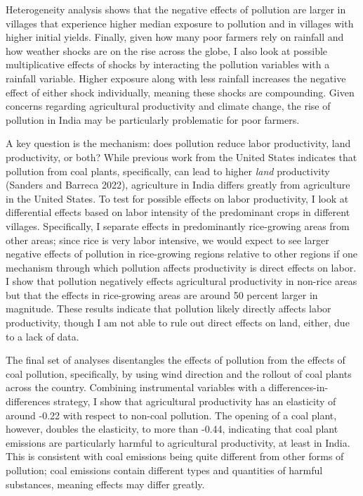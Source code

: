 \documentclass[
]{article}
\begin{document}
Heterogeneity analysis shows that the negative effects of pollution are larger in villages that experience higher median exposure to pollution and in villages with higher initial yields. Finally, given how many poor farmers rely on rainfall and how weather shocks are on the rise across the globe, I also look at possible multiplicative effects of shocks by interacting the pollution variables with a rainfall variable. Higher exposure along with less rainfall increases the negative effect of either shock individually, meaning these shocks are compounding. Given concerns regarding agricultural productivity and climate change, the rise of pollution in India may be particularly problematic for poor farmers.

A key question is the mechanism: does pollution reduce labor productivity, land productivity, or both? While previous work from the United States indicates that pollution from coal plants, specifically, can lead to higher \emph{land} productivity (Sanders and Barreca 2022), agriculture in India differs greatly from agriculture in the United States. To test for possible effects on labor productivity, I look at differential effects based on labor intensity of the predominant crops in different villages. Specifically, I separate effects in predominantly rice-growing areas from other areas; since rice is very labor intensive, we would expect to see larger negative effects of pollution in rice-growing regions relative to other regions if one mechanism through which pollution affects productivity is direct effects on labor. I show that pollution negatively effects agricultural productivity in non-rice areas but that the effects in rice-growing areas are around 50 percent larger in magnitude. These results indicate that pollution likely directly affects labor productivity, though I am not able to rule out direct effects on land, either, due to a lack of data.

The final set of analyses disentangles the effects of pollution from the effects of coal pollution, specifically, by using wind direction and the rollout of coal plants across the country. Combining instrumental variables with a differences-in-differences strategy, I show that agricultural productivity has an elasticity of around -0.22 with respect to non-coal pollution. The opening of a coal plant, however, doubles the elasticity, to more than -0.44, indicating that coal plant emissions are particularly harmful to agricultural productivity, at least in India. This is consistent with coal emissions being quite different from other forms of pollution; coal emissions contain different types and quantities of harmful substances, meaning effects may differ greatly.
\end{document}
